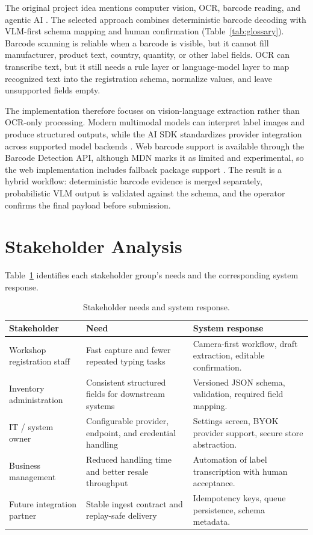 The original project idea mentions computer vision, OCR, barcode reading, and agentic AI \cite{buy2sell-brief}. The selected approach combines deterministic barcode decoding with VLM-first schema mapping and human confirmation (Table~\ref{tab:glossary}). Barcode scanning is reliable when a barcode is visible, but it cannot fill manufacturer, product text, country, quantity, or other label fields. OCR can transcribe text, but it still needs a rule layer or language-model layer to map recognized text into the registration schema, normalize values, and leave unsupported fields empty.

The implementation therefore focuses on vision-language extraction rather than OCR-only processing. Modern multimodal models can interpret label images and produce structured outputs, while the AI SDK standardizes provider integration across supported model backends \cite{ai-sdk}. Web barcode support is available through the Barcode Detection API, although MDN marks it as limited and experimental, so the web implementation includes fallback package support \cite{barcode-detection-api}. The result is a hybrid workflow: deterministic barcode evidence is merged separately, probabilistic VLM output is validated against the schema, and the operator confirms the final payload before submission.

\section{Stakeholder Analysis}

Table~\ref{tab:stakeholders} identifies each stakeholder group's needs and the corresponding system response.

\begin{table}[htbp]
\centering
\begin{tabularx}{\textwidth}{>{\raggedright\arraybackslash}p{}XX}
\toprule
Stakeholder & Need & System response \\
\midrule
Workshop registration staff & Fast capture and fewer repeated typing tasks & Camera-first workflow, draft extraction, editable confirmation. \\
Inventory administration & Consistent structured fields for downstream systems & Versioned JSON schema, validation, required field mapping. \\
IT / system owner & Configurable provider, endpoint, and credential handling & Settings screen, BYOK provider support, secure store abstraction. \\
Business management & Reduced handling time and better resale throughput & Automation of label transcription with human acceptance. \\
Future integration partner & Stable ingest contract and replay-safe delivery & Idempotency keys, queue persistence, schema metadata. \\
\bottomrule
\end{tabularx}
\caption{Stakeholder needs and system response.}
\label{tab:stakeholders}
\end{table}

